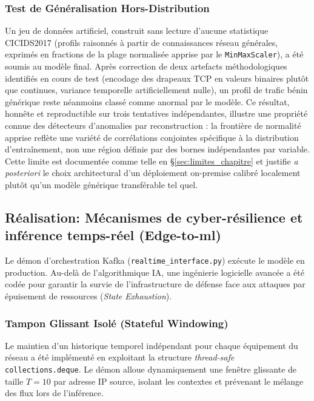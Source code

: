 \subsubsection{Test de Généralisation Hors-Distribution}
Un jeu de données artificiel, construit sans lecture d'aucune statistique CICIDS2017 (profils raisonnés à partir de connaissances réseau générales, exprimés en fractions de la plage normalisée apprise par le \texttt{MinMaxScaler}), a été soumis au modèle final. Après correction de deux artefacts méthodologiques identifiés en cours de test (encodage des drapeaux TCP en valeurs binaires plutôt que continues, variance temporelle artificiellement nulle), un profil de trafic bénin générique reste néanmoins classé comme anormal par le modèle. Ce résultat, honnête et reproductible sur trois tentatives indépendantes, illustre une propriété connue des détecteurs d'anomalies par reconstruction : la frontière de normalité apprise reflète une variété de corrélations conjointes spécifique à la distribution d'entraînement, non une région définie par des bornes indépendantes par variable. Cette limite est documentée comme telle en \S\ref{sec:limites_chapitre} et justifie \textit{a posteriori} le choix architectural d'un déploiement on-premise calibré localement plutôt qu'un modèle générique transférable tel quel.

\subsection{Réalisation: Mécanismes de cyber-résilience et inférence temps-réel (Edge-to-ml)}
\label{subsec:cyber_resilience}
Le démon d'orchestration Kafka (\texttt{realtime\_interface.py}) exécute le modèle en production. Au-delà de l'algorithmique IA, une ingénierie logicielle avancée a été codée pour garantir la survie de l'infrastructure de défense face aux attaques par épuisement de ressources (\textit{State Exhaustion}).

\subsubsection{Tampon Glissant Isolé (Stateful Windowing)}
Le maintien d'un historique temporel indépendant pour chaque équipement du réseau a été implémenté en exploitant la structure \textit{thread-safe} \texttt{collections.deque}. Le démon alloue dynamiquement une fenêtre glissante de taille $T=10$ par adresse IP source, isolant les contextes et prévenant le mélange des flux lors de l'inférence.

